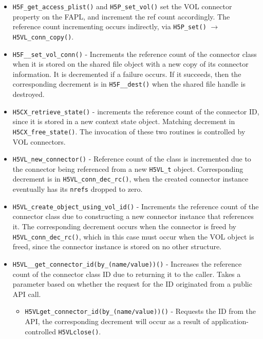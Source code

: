 \begin{itemize}



    \item \texttt{H5F\_get\_access\_plist()} and \texttt{H5P\_set\_vol()} set the VOL connector property on the FAPL, and increment the ref count accordingly. The reference count incrementing occurs indirectly, via \texttt{H5P\_set()} $\rightarrow$ \texttt{H5VL\_conn\_copy()}.

    \item \texttt{H5F\_\_set\_vol\_conn()} - Increments the reference count of the connector class when it is stored on the shared file object with a new copy of its connector information. It is decremented if a failure occurs. If it succeeds, then the corresponding decrement is in \texttt{H5F\_\_dest()} when the shared file handle is destroyed. 

    \item \texttt{H5CX\_retrieve\_state()} - increments the reference count of the connector ID, since it is stored in a new context state object. Matching decrement in \texttt{H5CX\_free\_state()}. The invocation of these two routines is controlled by VOL connectors.


    \item \texttt{H5VL\_new\_connector()} - Reference count of the class is incremented due to the connector being referenced from a new \texttt{H5VL\_t} object. Corresponding decrement is in \texttt{H5VL\_conn\_dec\_rc()}, when the created connector instance eventually has its \texttt{nrefs} dropped to zero.

    \item \texttt{H5VL\_create\_object\_using\_vol\_id()} - Increments the reference count of the connector class due to constructing a new connector instance that references it. The corresponding decrement occurs when the connector is freed by \texttt{H5VL\_conn\_dec\_rc()}, which in this case must occur when the VOL object is freed, since the connector instance is stored on no other structure.

    \item \texttt{H5VL\_\_get\_connector\_id(by\_(name/value))()} - Increases the reference count of the connector class ID due to returning it to the caller. Takes a parameter based on whether the request for the ID originated from a public API call.

    
    \begin{itemize}
         \item \texttt{H5VLget\_connector\_id(by\_(name/value))()} - Requests the ID from the API, the corresponding decrement will occur as a result of application-controlled \texttt{H5VLclose()}.
    

\end{itemize}
\end{itemize}
